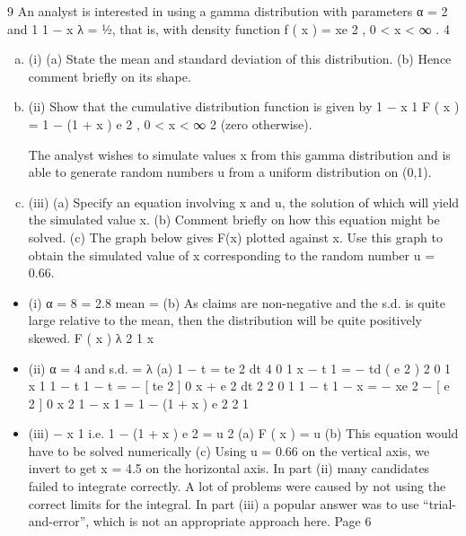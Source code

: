 \documentclass[a4paper,12pt]{article}
\begin{document}
9
An analyst is interested in using a gamma distribution with parameters α = 2 and
1
1 − x
λ = 1⁄2, that is, with density function f ( x ) = xe 2 , 0 < x < ∞ .
4
\begin{enumerate}[(a)]
\item (i)
(a) State the mean and standard deviation of this distribution.
(b) Hence comment briefly on its shape.
\item 
(ii)
Show that the cumulative distribution function is given by
1
− x
1
F ( x ) = 1 − (1 + x ) e 2 , 0 < x < ∞
2
(zero otherwise).

The analyst wishes to simulate values x from this gamma distribution and is able to
generate random numbers u from a uniform distribution on (0,1).
\item (iii)
(a) Specify an equation involving x and u, the solution of which will yield
the simulated value x.
(b) Comment briefly on how this equation might be solved.
(c) The graph below gives F(x) plotted against x. Use this graph to obtain
the simulated value of x corresponding to the random number u = 0.66.

\end{enumerate}

\begin{itemize}
\item (i)
α
= 8 = 2.8
mean =
(b) As claims are non-negative and the s.d. is quite large relative to the
mean, then the distribution will be quite positively skewed.
F ( x )
λ 2
1
x
\item (ii)
α
= 4 and s.d. =
λ
(a)
1 − t
= \int te 2 dt
4
0
1
x
− t
1
= − \int td ( e 2 )
2
0
1
x
1
1 − t
1 − t
= − [ te 2 ] 0 x + \int e 2 dt
2
2
0
1
1
− t
1 − x
= − xe 2 − [ e 2 ] 0 x
2
1
− x
1
= 1 − (1 + x ) e 2
2
1
\item 
(iii)
− x
1
i.e. 1 − (1 + x ) e 2 = u
2
(a) F ( x ) = u
(b) This equation would have to be solved numerically
(c) Using u = 0.66 on the vertical axis, we invert to get x = 4.5 on the
horizontal axis.
In part (ii) many candidates failed to integrate correctly. A lot of problems were caused by not using the correct limits for the integral. In part (iii) a popular answer was to use “trial-
and-error”, which is not an appropriate approach here.
Page 6%
\end{itemize}
\end{document}
